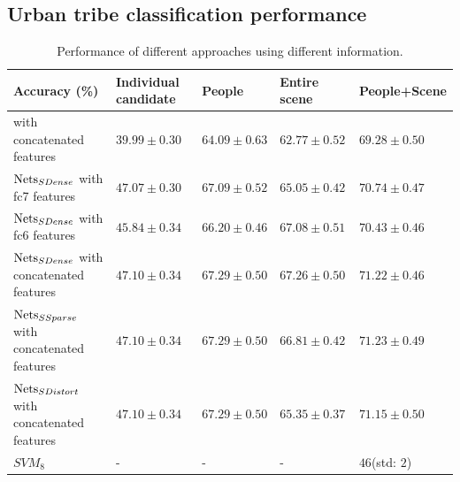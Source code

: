 \documentclass[10pt,twocolumn,letterpaper]{article}
\begin{document}
\subsection{Urban tribe classification performance}

\begin{table}[!t]
\centering
    \caption{Performance of different approaches using different information. }
    \label{table1}
    \begin{tabular}{l|l|l|l|l}
    \hline
    Accuracy (\%)                                          & Individual candidate & People & Entire scene & People+Scene \\ \hline

       with concatenated features               & $39.99\pm0.30$                    & $64.09\pm0.63$      & $62.77\pm0.52$            & $69.28\pm0.50$            \\ \hline
    $\textup{Nets}_{SDense}$ with fc7 features & $47.07 \pm0.30$ & $67.09 \pm 0.52$      & $65.05 \pm0.42$            & $70.74\pm0.47$      \\ \hline
     $\textup{Nets}_{SDense}$ with fc6 features & $45.84 \pm0.34$ & $66.20 \pm 0.46$      & $67.08 \pm0.51$            & $70.43\pm0.46$      \\ \hline
     $\textup{Nets}_{SDense}$ with concatenated features     &  $\mathbf{47.10 \pm0.34}$ & $\mathbf{67.29 \pm 0.50}$      & $\mathbf{67.26 \pm0.50}$            & $71.22\pm0.46$      \\ \hline
    $\textup{Nets}_{SSparse}$ with concatenated features               & $\mathbf{47.10 \pm0.34}$                    &$\mathbf{67.29  \pm 0.50}$        & $66.81\pm0.42$            & $\mathbf{71.23\pm0.49}$            \\ \hline
    $\textup{Nets}_{SDistort}$ with concatenated features               &  $\mathbf{47.10 \pm0.34}$          &$\mathbf{67.29 \pm 0.50}$       & $65.35\pm0.37$            & $71.15\pm0.50$            \\ \hline
    $SVM_{8}$\cite{urbantribe2} & - & - & - & $46$(std: $2$)  \\ \hline


    \end{tabular}
\end{table}
\end{document}
